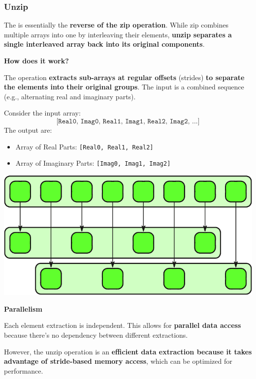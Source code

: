 \subsubsection{Unzip}

The  is essentially the \textbf{reverse of the zip operation}. While zip combines multiple arrays into one by interleaving their elements, \textbf{unzip separates a single interleaved array back into its original components}.

\highspace
\begin{flushleft}
    \textcolor{Green3}{ \textbf{How does it work?}}
\end{flushleft}
The operation \textbf{extracts sub-arrays at regular offsets} (strides) \textbf{to separate the elements into their original groups}. The input is a combined sequence (e.g., alternating real and imaginary parts).
\begin{examplebox}
    Consider the input array:
    \begin{equation*}
        \texttt{[Real0, Imag0, Real1, Imag1, Real2, Imag2, ...]}
    \end{equation*}
    The output are:
    \begin{itemize}
        \item Array of Real Parts: \texttt{[Real0, Real1, Real2]}
        \item Array of Imaginary Parts: \texttt{[Imag0, Imag1, Imag2]}
    \end{itemize}
    \begin{center}
        \includegraphics[width=.7\textwidth]{img/unzip-1.pdf}
    \end{center}
\end{examplebox}

\highspace
\begin{flushleft}
    \textcolor{Green3}{ \textbf{Parallelism}}
\end{flushleft}
Each element extraction is independent. This allows for \textbf{parallel data access} because there's no dependency between different extractions.

\highspace
However, the unzip operation is an \textbf{efficient data extraction because it takes advantage of stride-based memory access}, which can be optimized for performance.